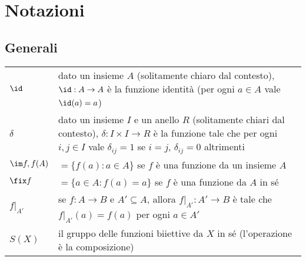 \renewcommand{\arraystretch}{1.5}

\setcounter{chapter}{-1}

\chapter{Notazioni}
\section{Generali}
\begin{tabularx}{\textwidth}{SX}
\hline
$\id$ & dato un insieme $A$ (solitamente chiaro dal contesto), $\id:A\to A$ è la funzione identità (per ogni $a\in A$ vale $\id(a)=a$)\\
$\delta$ & dato un insieme $I$ e un anello $R$ (solitamente chiari dal contesto), $\delta:I\times I\to R$ è la funzione tale che per ogni $i,j\in I$ vale $\delta_{ij}=1$ se $i=j$, $\delta_{ij}=0$ altrimenti \\
$\im f,f(A)$ & $=\{f(a):a\in A\}$ se $f$ è una funzione da un insieme $A$\\
$\fix f$ & $=\{a\in A:f(a)=a\}$ se $f$ è una funzione da $A$ in sé\\
$f|_{A'}$ & se $f:A\to B$ e $A'\subseteq A$, allora $f|_{A'}:A'\to B$ è tale che $f|_{A'}(a)=f(a)$ per ogni $a\in A'$\\
$S(X)$ & il gruppo delle funzioni biiettive da $X$ in sé (l'operazione è la composizione)\\
\hline
\end{tabularx}
